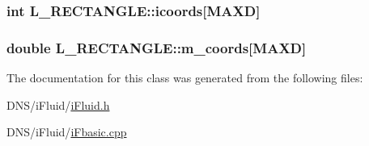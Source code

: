 \subsubsection[{\texorpdfstring{icoords}{icoords}}]{\setlength{\rightskip}{0pt plus 5cm}int L\+\_\+\+R\+E\+C\+T\+A\+N\+G\+L\+E\+::icoords\mbox{[}{\bf M\+A\+XD}\mbox{]}}\hypertarget{class_l___r_e_c_t_a_n_g_l_e_a9a8133311c4cc3db39d60f6fd37f8eb8}{}\label{class_l___r_e_c_t_a_n_g_l_e_a9a8133311c4cc3db39d60f6fd37f8eb8}
\subsubsection[{\texorpdfstring{m\+\_\+coords}{m_coords}}]{\setlength{\rightskip}{0pt plus 5cm}double L\+\_\+\+R\+E\+C\+T\+A\+N\+G\+L\+E\+::m\+\_\+coords\mbox{[}{\bf M\+A\+XD}\mbox{]}}\hypertarget{class_l___r_e_c_t_a_n_g_l_e_a1e1f2d9759fb7ba7b6476e699b7ff876}{}\label{class_l___r_e_c_t_a_n_g_l_e_a1e1f2d9759fb7ba7b6476e699b7ff876}


The documentation for this class was generated from the following files\+:\begin{DoxyCompactItemize}
\item 
D\+N\+S/i\+Fluid/\hyperlink{i_fluid_8h}{i\+Fluid.\+h}\item 
D\+N\+S/i\+Fluid/\hyperlink{i_fbasic_8cpp}{i\+Fbasic.\+cpp}\end{DoxyCompactItemize}
